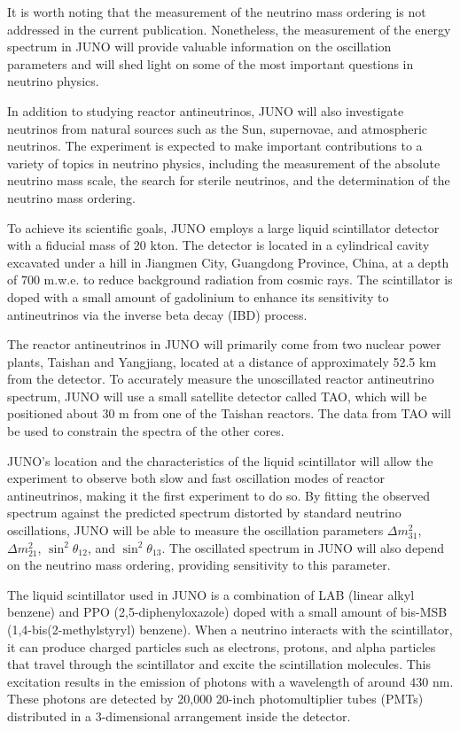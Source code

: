 It is worth noting that the measurement of the neutrino mass ordering is not addressed in the current publication. Nonetheless, the measurement of the energy spectrum in JUNO will provide valuable information on the oscillation parameters and will shed light on some of the most important questions in neutrino physics.

In addition to studying reactor antineutrinos, JUNO will also investigate neutrinos from natural sources such as the Sun, supernovae, and atmospheric neutrinos. The experiment is expected to make important contributions to a variety of topics in neutrino physics, including the measurement of the absolute neutrino mass scale, the search for sterile neutrinos, and the determination of the neutrino mass ordering.

To achieve its scientific goals, JUNO employs a large liquid scintillator detector with a fiducial mass of 20 kton. The detector is located in a cylindrical cavity excavated under a hill in Jiangmen City, Guangdong Province, China, at a depth of 700 m.w.e. to reduce background radiation from cosmic rays. The scintillator is doped with a small amount of gadolinium to enhance its sensitivity to antineutrinos via the inverse beta decay (IBD) process.

The reactor antineutrinos in JUNO will primarily come from two nuclear power plants, Taishan and Yangjiang, located at a distance of approximately 52.5 km from the detector. To accurately measure the unoscillated reactor antineutrino spectrum, JUNO will use a small satellite detector called TAO, which will be positioned about 30 m from one of the Taishan reactors. The data from TAO will be used to constrain the spectra of the other cores.

JUNO's location and the characteristics of the liquid scintillator will allow the experiment to observe both slow and fast oscillation modes of reactor antineutrinos, making it the first experiment to do so. By fitting the observed spectrum against the predicted spectrum distorted by standard neutrino oscillations, JUNO will be able to measure the oscillation parameters $\Delta m_{31}^2$, $\Delta m_{21}^2$, $\sin ^2 \theta_{12}$, and $\sin ^2 \theta_{13}$. The oscillated spectrum in JUNO will also depend on the neutrino mass ordering, providing sensitivity to this parameter.


The liquid scintillator used in JUNO is a combination of LAB (linear alkyl benzene) and PPO (2,5-diphenyloxazole) doped with a small amount of bis-MSB (1,4-bis(2-methylstyryl) benzene). When a neutrino interacts with the scintillator, it can produce charged particles such as electrons, protons, and alpha particles that travel through the scintillator and excite the scintillation molecules. This excitation results in the emission of photons with a wavelength of around 430 nm. These photons are detected by 20,000 20-inch photomultiplier tubes (PMTs) distributed in a 3-dimensional arrangement inside the detector.

